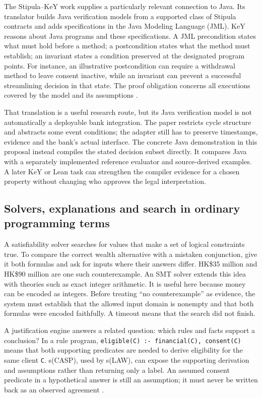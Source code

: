 The Stipula--KeY work supplies a particularly relevant connection to Java.
Its translator builds Java verification models from a supported class of
Stipula contracts and adds specifications in the Java Modeling Language (JML).
KeY reasons about Java programs and these specifications. A JML precondition
states what must hold before a method; a postcondition states what the method
must establish; an invariant states a condition preserved at the designated
program points. For instance, an illustrative postcondition can require a
withdrawal method to leave consent inactive, while an invariant can prevent a
successful streamlining decision in that state. The proof obligation concerns
all executions covered by the model and its assumptions
\citep[secs.~3--5]{stipulakey2025,stipulakeycode}.

That translation is a useful research route, but its Java verification model is
not automatically a deployable bank integration. The paper restricts cycle
structure and abstracts some event conditions; the adapter still has to preserve
timestamps, evidence and the bank's actual interface. The concrete Java
demonstration in this proposal instead compiles the stated decision subset
directly. It compares Java with a separately implemented reference evaluator
and source-derived examples. A later KeY or Lean task can strengthen the
compiler evidence for a chosen property without changing who approves the
legal interpretation.

\subsection{Solvers, explanations and search in ordinary programming terms}

A satisfiability solver searches for values that make a set of logical
constraints true. To compare the correct wealth alternative with a mistaken
conjunction, give it both formulas and ask for inputs where their answers differ.
HK\$35 million and HK\$90 million are one such counterexample. An SMT solver
extends this idea with theories such as exact integer arithmetic. It is useful
here because money can be encoded as integers. Before treating ``no
counterexample'' as evidence, the system must establish that the allowed input
domain is nonempty and that both formulas were encoded faithfully. A timeout
means that the search did not finish.

A justification engine answers a related question: which rules and facts support
a conclusion? In a rule program, \texttt{eligible(C) :- financial(C), consent(C)}
means that both supporting predicates are needed to derive eligibility for the
same client \texttt{C}. s(CASP), used by s(LAW), can expose the supporting
derivation and assumptions rather than returning only a label. An assumed
consent predicate in a hypothetical answer is still an assumption; it must never
be written back as an observed agreement \citep{slaw2024}.

